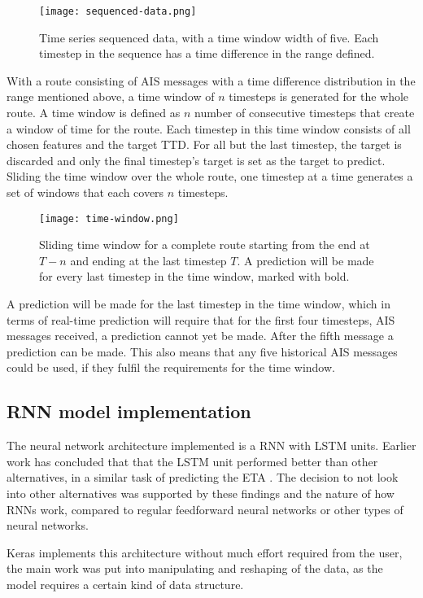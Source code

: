 \documentclass[../main.tex]{subfiles}
\begin{document}
\begin{figure}[H]
	\centering
	\texttt{[image: sequenced-data.png]}
	\caption{Time series sequenced data, with a time window width of five. Each timestep in the sequence has a time difference in the range defined.}
	\label{fig:seq-data}
\end{figure}

With a route consisting of AIS messages with a time difference distribution in the range mentioned above, a time window of $n$ timesteps is generated for the whole route. A time window is defined as $n$ number of consecutive timesteps that create a window of time for the route. Each timestep in this time window consists of all chosen features and the target TTD. For all but the last timestep, the target is discarded and only the final timestep's target is set as the target to predict. Sliding the time window over the whole route, one timestep at a time generates a set of windows that each covers $n$ timesteps. 

\begin{figure}[H]
	\centering
	\texttt{[image: time-window.png]}
	\caption{Sliding time window for a complete route starting from the end at $T-n$ and ending at the last timestep $T$. A prediction will be made for every last timestep in the time window, marked with bold.}
	\label{fig:time-window}
\end{figure}

A prediction will be made for the last timestep in the time window, which in terms of real-time prediction will require that for the first four timesteps, AIS messages received, a prediction cannot yet be made. After the fifth message a prediction can be made. This also means that any five historical AIS messages could be used, if they fulfil the requirements for the time window.


\subsection{RNN model implementation}
The neural network architecture implemented is a RNN with LSTM units. Earlier work has concluded that that the LSTM unit performed better than other alternatives, in a similar task of predicting the ETA \cite{El_2020}. The decision to not look into other alternatives was supported by these findings and the nature of how RNNs work, compared to regular feedforward neural networks or other types of neural networks.

Keras implements this architecture without much effort required from the user, the main work was put into manipulating and reshaping of the data, as the model requires a certain kind of data structure.
\end{document}
